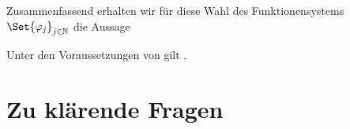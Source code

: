 Zusammenfassend erhalten wir für diese Wahl des Funktionensystems $\Set{ \varphi_{j} }_{j \in \mathbb{N}}$ die Aussage

\begin{Korollar}
    Unter den Voraussetzungen von  gilt .
\end{Korollar}



\clearpage
\section{Zu klärende Fragen} %
\label{sub:zu_kl_rende_fragen}

